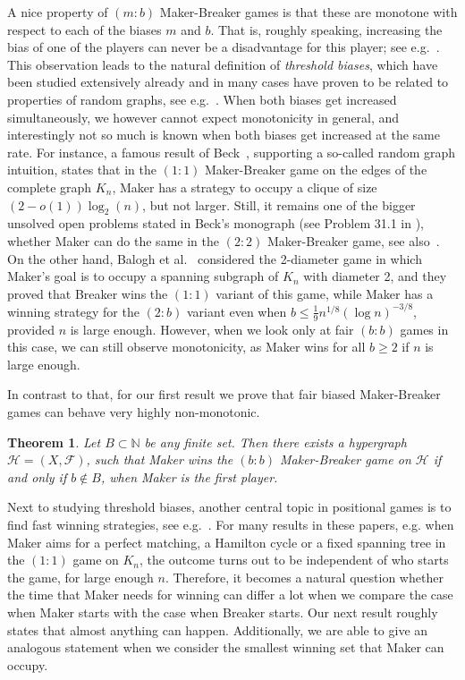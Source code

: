 \documentclass[reqno, 12pt]{amsart}
\numberwithin{equation}{section}
\numberwithin{figure}{section}
\newtheorem{theorem}{Theorem}
\newcommand{\calH}{\mathcal{H}}
\newcommand{\calF}{\mathcal{F}}
\begin{document}
A nice property of $(m:b)$ Maker-Breaker games is that these are monotone with respect to each of the biases $m$ and $b$.
That is, roughly speaking, increasing the bias of one
of the players can never be a disadvantage for this player;
see e.g.~\cite{beck2008combinatorial,hefetz2014positional}. 
This observation leads to the natural definition of 
\textit{threshold biases}, which 
have been studied extensively already and
in many cases have proven to be related to properties of random graphs, see e.g.~\cite{bednarska2000biased,ferber2015generating,gebauer2009asymptotic,krivelevich2011critical,nenadov2023probabilistic}. When both biases get increased simultaneously,
we however cannot expect monotonicity in general, and 
interestingly not so much is known when both biases get increased at the same rate.
For instance, a famous result of Beck~\cite{beck2008combinatorial}, supporting a so-called random graph intuition, states that in the $(1:1)$ Maker-Breaker game on the edges of the complete graph $K_n$,  Maker has a strategy to occupy a clique
of size $(2-o(1))\log_2(n)$, but not larger. 
Still, it remains one of the bigger unsolved open problems stated in Beck's monograph (see Problem 31.1 in \cite{beck2008combinatorial}), whether Maker can do the same in the $(2:2)$ Maker-Breaker game, see also~\cite{gebauer2012clique}.
On the other hand, Balogh et al.~\cite{balogh2009diameter} 
considered the 2-diameter game in which Maker's goal is to occupy a spanning subgraph of $K_n$ with diameter 2, and they proved that Breaker wins the $(1:1)$ variant of this game, while Maker has a winning strategy for the $(2:b)$ variant even when $b\leq \frac{1}{9}n^{1/8}(\log n)^{-3/8}$, provided $n$ is large enough. However, when we look only at fair $(b:b)$ games in this case, we can still observe monotonicity, as Maker wins for all $b\geq 2$ if $n$ is large enough.

In contrast to that, for our first result we prove that fair biased Maker-Breaker games can behave very highly non-monotonic. 

\begin{theorem}
\label{thm:construction.MB.not.monotone}
Let $B\subset \mathbb{N}$ be any finite set. Then there exists a hypergraph $\calH = (X,\calF)$, such that
Maker wins the $(b:b)$ Maker-Breaker game on $\calH$ if and only if $b\notin B$, when Maker is the first player.
\end{theorem}

Next to studying threshold biases, another central topic in positional games is to find fast winning strategies, see e.g.~\cite{clemens2012fast,clemens2020fast,ferber2014weak,ferber2012fast,hefetz2009fast,mikalavcki2018fast}. For many results in these papers, e.g. when Maker aims for a perfect matching, a Hamilton cycle or a fixed spanning tree in the $(1:1)$ game on $K_n$,
the outcome turns out to be independent of who starts the game,
for large enough $n$. Therefore, it becomes a natural question whether the time that Maker needs for winning can differ a lot when we compare the case when Maker starts with the case when Breaker starts. Our next result roughly states that almost anything can happen. Additionally, we are able to give an analogous statement when we consider the smallest winning set that Maker can occupy.
\end{document}
